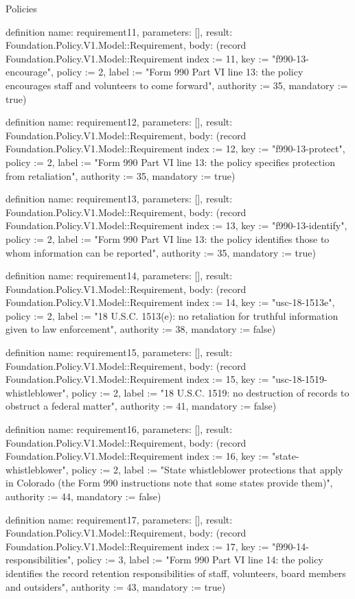 \begin{lexlean}{Policies}
\begin{semanticmodule}
definition{
  name: requirement11,
  parameters: [],
  result: Foundation.Policy.V1.Model::Requirement,
  body: (record Foundation.Policy.V1.Model::Requirement {index := 11, key := "f990-13-encourage", policy := 2, label := "Form 990 Part VI line 13: the policy encourages staff and volunteers to come forward", authority := 35, mandatory := true})
}

definition{
  name: requirement12,
  parameters: [],
  result: Foundation.Policy.V1.Model::Requirement,
  body: (record Foundation.Policy.V1.Model::Requirement {index := 12, key := "f990-13-protect", policy := 2, label := "Form 990 Part VI line 13: the policy specifies protection from retaliation", authority := 35, mandatory := true})
}

definition{
  name: requirement13,
  parameters: [],
  result: Foundation.Policy.V1.Model::Requirement,
  body: (record Foundation.Policy.V1.Model::Requirement {index := 13, key := "f990-13-identify", policy := 2, label := "Form 990 Part VI line 13: the policy identifies those to whom information can be reported", authority := 35, mandatory := true})
}

definition{
  name: requirement14,
  parameters: [],
  result: Foundation.Policy.V1.Model::Requirement,
  body: (record Foundation.Policy.V1.Model::Requirement {index := 14, key := "usc-18-1513e", policy := 2, label := "18 U.S.C. 1513(e): no retaliation for truthful information given to law enforcement", authority := 38, mandatory := false})
}

definition{
  name: requirement15,
  parameters: [],
  result: Foundation.Policy.V1.Model::Requirement,
  body: (record Foundation.Policy.V1.Model::Requirement {index := 15, key := "usc-18-1519-whistleblower", policy := 2, label := "18 U.S.C. 1519: no destruction of records to obstruct a federal matter", authority := 41, mandatory := false})
}

definition{
  name: requirement16,
  parameters: [],
  result: Foundation.Policy.V1.Model::Requirement,
  body: (record Foundation.Policy.V1.Model::Requirement {index := 16, key := "state-whistleblower", policy := 2, label := "State whistleblower protections that apply in Colorado (the Form 990 instructions note that some states provide them)", authority := 44, mandatory := false})
}

definition{
  name: requirement17,
  parameters: [],
  result: Foundation.Policy.V1.Model::Requirement,
  body: (record Foundation.Policy.V1.Model::Requirement {index := 17, key := "f990-14-responsibilities", policy := 3, label := "Form 990 Part VI line 14: the policy identifies the record retention responsibilities of staff, volunteers, board members and outsiders", authority := 43, mandatory := true})
}


\end{semanticmodule}
\end{lexlean}
